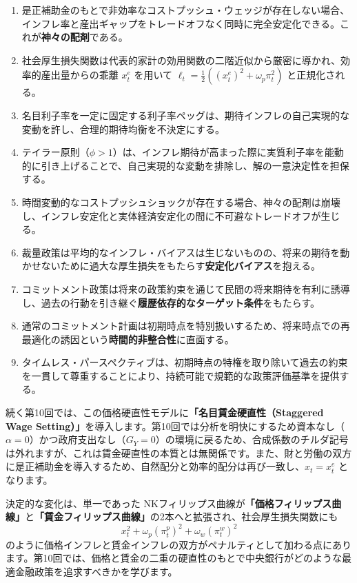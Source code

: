\documentclass[
  japanese,
  lualatex,
  ja=standard,
  12pt,
  a4paper]{ltjsarticle}
\providecommand{\tightlist}{%
  \setlength{\itemsep}{0pt}\setlength{\parskip}{0pt}}
\begin{document}
\begin{enumerate}
\def\labelenumi{\arabic{enumi}.}
\tightlist
\item
  是正補助金のもとで非効率なコストプッシュ・ウェッジが存在しない場合、インフレ率と産出ギャップをトレードオフなく同時に完全安定化できる。これが\textbf{神々の配剤}である。
\item
  社会厚生損失関数は代表的家計の効用関数の二階近似から厳密に導かれ、効率的産出量からの乖離
  \(x_t^e\) を用いて
  \(\ell_t = \frac{1}{2}((x_t^e)^2 + \omega_p\pi_t^2)\) と正規化される。
\item
  名目利子率を一定に固定する利子率ペッグは、期待インフレの自己実現的な変動を許し、合理的期待均衡を不決定にする。
\item
  テイラー原則（\(\phi>1\)）は、インフレ期待が高まった際に実質利子率を能動的に引き上げることで、自己実現的な変動を排除し、解の一意決定性を担保する。
\item
  時間変動的なコストプッシュショックが存在する場合、神々の配剤は崩壊し、インフレ安定化と実体経済安定化の間に不可避なトレードオフが生じる。
\item
  裁量政策は平均的なインフレ・バイアスは生じないものの、将来の期待を動かせないために過大な厚生損失をもたらす\textbf{安定化バイアス}を抱える。
\item
  コミットメント政策は将来の政策約束を通じて民間の将来期待を有利に誘導し、過去の行動を引き継ぐ\textbf{履歴依存的なターゲット条件}をもたらす。
\item
  通常のコミットメント計画は初期時点を特別扱いするため、将来時点での再最適化の誘因という\textbf{時間的非整合性}に直面する。
\item
  タイムレス・パースペクティブは、初期時点の特権を取り除いて過去の約束を一貫して尊重することにより、持続可能で規範的な政策評価基準を提供する。
\end{enumerate}

続く第10回では、この価格硬直性モデルに\textbf{「名目賃金硬直性（Staggered
Wage
Setting）」}を導入します。第10回では分析を明快にするため資本なし（\(\alpha=0\)）かつ政府支出なし（\(G_Y=0\)）の環境に戻るため、合成係数のチルダ記号は外れますが、これは賃金硬直性の本質とは無関係です。また、財と労働の双方に是正補助金を導入するため、自然配分と効率的配分は再び一致し、\(x_t = x_t^e\)
となります。

決定的な変化は、単一であった
NKフィリップス曲線が\textbf{「価格フィリップス曲線」}と\textbf{「賃金フィリップス曲線」}の2本へと拡張され、社会厚生損失関数にも
\[
x_t^2+\omega_p(\pi_t^p)^2+\omega_w(\pi_t^w)^2
\]
のように価格インフレと賃金インフレの双方がペナルティとして加わる点にあります。第10回では、価格と賃金の二重の硬直性のもとで中央銀行がどのような最適金融政策を追求すべきかを学びます。
\end{document}
